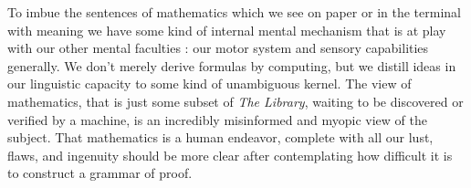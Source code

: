 To imbue the sentences of mathematics which we see on paper or in the terminal
with meaning we have some kind of internal mental mechanism that is at play with
our other mental faculties : our motor system and sensory capabilities generally.
We don't merely derive formulas by computing, but we distill ideas in our
linguistic capacity to some kind of unambiguous kernel. The view of mathematics,
that is just some subset of \emph{The Library}, waiting to be discovered or verified by a
machine, is an incredibly misinformed and myopic view of the subject. That
mathematics is a human endeavor, complete with all our lust, flaws, and
ingenuity should be more clear after contemplating how difficult it is to
construct a grammar of proof.




 


